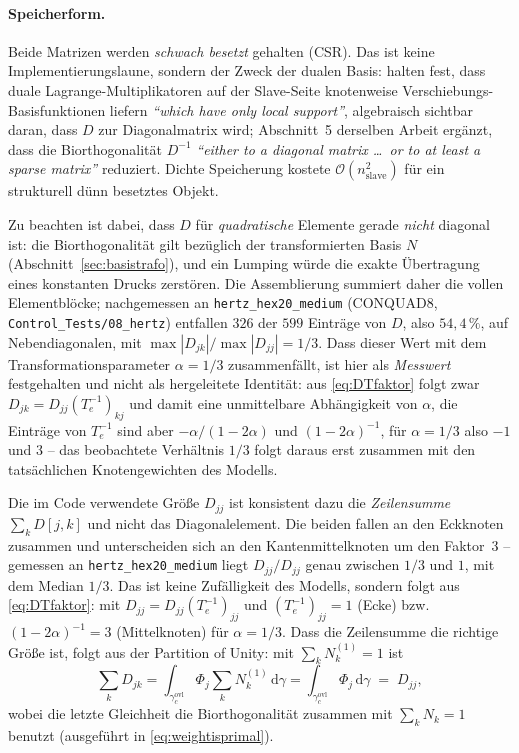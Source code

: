 \documentclass[a4paper,11pt]{article}
\def\bm#1{#1}%
\def\tfrac#1#2{#1/#2}%
\def\tilde#1{#1}%
\newcommand{\file}[1]{\texttt{\small #1}}
\begin{document}
\paragraph{Speicherform.}
Beide Matrizen werden \emph{schwach besetzt} gehalten (CSR). Das ist keine Implementierungslaune,
sondern der Zweck der dualen Basis: \citet[Abschn.~4.2]{popp2012} halten fest, dass duale
Lagrange-Multiplikatoren auf der Slave-Seite knotenweise Verschiebungs-Basisfunktionen liefern
\emph{``which have only local support''}, algebraisch sichtbar daran, dass $\bm D$ zur Diagonalmatrix
wird; Abschnitt~5 derselben Arbeit ergänzt, dass die Biorthogonalität $\bm D^{-1}$ \emph{``either to
a diagonal matrix \ldots\ or to at least a sparse matrix''} reduziert. Dichte Speicherung kostete
$\mathcal O(n_{\text{slave}}^2)$ für ein strukturell dünn besetztes Objekt.

Zu beachten ist dabei, dass $\bm D$ für \emph{quadratische} Elemente gerade \emph{nicht} diagonal
ist: die Biorthogonalität gilt bezüglich der transformierten Basis $\tilde{\bm N}$
(Abschnitt~\ref{sec:basistrafo}), und ein Lumping würde die exakte Übertragung eines konstanten
Drucks zerstören. Die Assemblierung summiert daher die vollen Elementblöcke; nachgemessen an
\file{hertz\_hex20\_medium} (CONQUAD8, \file{Control\_Tests/08\_hertz}) entfallen $326$ der $599$
Einträge von $\bm D$, also $54{,}4\,\%$, auf Nebendiagonalen, mit
$\max|D_{jk}|/\max|D_{jj}| = \tfrac13$. Dass dieser Wert mit dem Transformationsparameter
$\alpha=\tfrac13$ zusammenfällt, ist hier als \emph{Messwert} festgehalten und nicht als
hergeleitete Identität: aus \eqref{eq:DTfaktor} folgt zwar $D_{jk}=\tilde D_{jj}(\bm
T_e^{-1})_{kj}$ und damit eine unmittelbare Abhängigkeit von $\alpha$, die Einträge von
$\bm T_e^{-1}$ sind aber $-\alpha/(1-2\alpha)$ und $(1-2\alpha)^{-1}$, für $\alpha=\tfrac13$ also
$-1$ und $3$ -- das beobachtete Verhältnis $\tfrac13$ folgt daraus erst zusammen mit den
tatsächlichen Knotengewichten des Modells.

Die im Code verwendete Größe $\tilde D_{jj}$ ist konsistent dazu die \emph{Zeilensumme}
$\sum_k \bm D[j,k]$ und nicht das Diagonalelement. Die beiden fallen an den Eckknoten zusammen und
unterscheiden sich an den Kantenmittelknoten um den Faktor~$3$ -- gemessen an
\file{hertz\_hex20\_medium} liegt $\tilde D_{jj}/D_{jj}$ genau zwischen $\tfrac13$ und $1$, mit
dem Median $\tfrac13$. Das ist keine Zufälligkeit des Modells, sondern folgt aus
\eqref{eq:DTfaktor}: mit $D_{jj}=\tilde D_{jj}(\bm T_e^{-1})_{jj}$ und
$(\bm T_e^{-1})_{jj}=1$ (Ecke) bzw.\ $(1-2\alpha)^{-1}=3$ (Mittelknoten) für
$\alpha=\tfrac13$. Dass die Zeilensumme die richtige Größe ist, folgt aus der Partition of Unity: mit
$\sum_k N_k^{(1)}=1$ ist
\begin{equation}
\sum_k D_{jk} = \int_{\gamma_c^{\text{ovl}}} \Phi_j \sum_k N_k^{(1)}\,\mathrm d\gamma
= \int_{\gamma_c^{\text{ovl}}} \Phi_j\,\mathrm d\gamma \;=\; \tilde D_{jj},
\label{eq:rowsum_is_weight}
\end{equation}
wobei die letzte Gleichheit die Biorthogonalität zusammen mit $\sum_k\tilde N_k=1$ benutzt
(ausgeführt in \eqref{eq:weightisprimal}).
\end{document}
